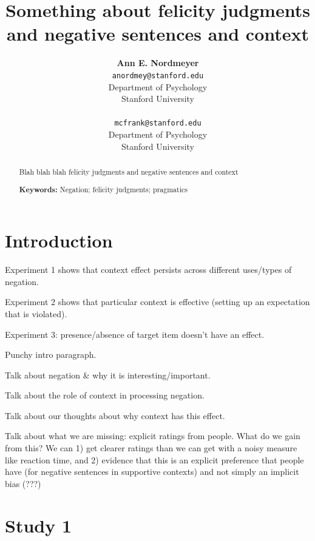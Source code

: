 \documentclass[10pt,letterpaper]{article}
\title{Something about felicity judgments and negative sentences and context}
\author{{\large \bf Ann E. Nordmeyer} \\ \texttt{anordmey@stanford.edu}\\ Department of Psychology \\ Stanford University \\ 
\And {\large \bf Michael C. Frank} \\ \texttt{mcfrank@stanford.edu} \\ Department of Psychology \\ Stanford University \\ }
\begin{document}
\maketitle


\begin{abstract}
Blah blah blah felicity judgments and negative sentences and context

\textbf{Keywords:} 
Negation; felicity judgments; pragmatics
\end{abstract}

\section{Introduction}

Experiment 1 shows that context effect persists across different uses/types of negation.

Experiment 2 shows that particular context is effective (setting up an expectation that is violated).

Experiment 3: presence/absence of target item doesn't have an effect.   

Punchy intro paragraph.


Talk about negation \& why it is interesting/important.

Talk about the role of context in processing negation.

Talk about our thoughts about why context has this effect.

Talk about what we are missing: explicit ratings from people.  What do we gain from this?  We can 1) get clearer ratings than we can get with a noisy measure like reaction time, and 2) evidence that this is an explicit preference that people have (for negative sentences in supportive contexts) and not simply an implicit bias (???)

\section{Study 1}
\end{document}
